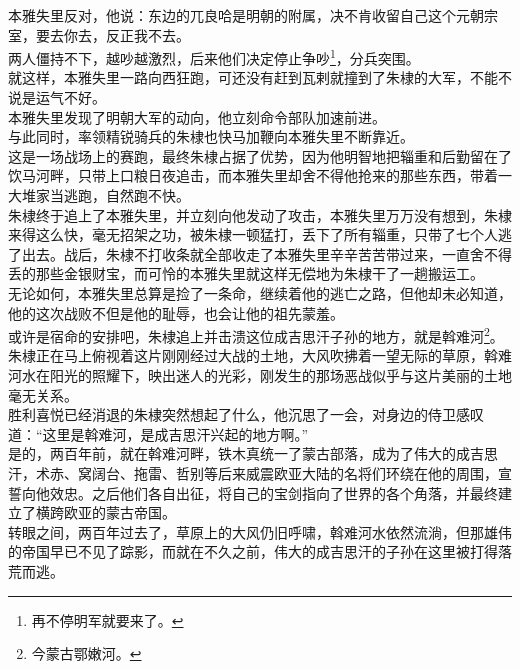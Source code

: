 \begin{multicols}{\theparacolNo}
本雅失里反对，他说：东边的兀良哈是明朝的附属，决不肯收留自己这个元朝宗室，要去你去，反正我不去。\\

两人僵持不下，越吵越激烈，后来他们决定停止争吵\footnote{再不停明军就要来了。}，分兵突围。\\

就这样，本雅失里一路向西狂跑，可还没有赶到瓦剌就撞到了朱棣的大军，不能不说是运气不好。\\

本雅失里发现了明朝大军的动向，他立刻命令部队加速前进。\\

与此同时，率领精锐骑兵的朱棣也快马加鞭向本雅失里不断靠近。\\

这是一场战场上的赛跑，最终朱棣占据了优势，因为他明智地把辎重和后勤留在了饮马河畔，只带上口粮日夜追击，而本雅失里却舍不得他抢来的那些东西，带着一大堆家当逃跑，自然跑不快。\\

朱棣终于追上了本雅失里，并立刻向他发动了攻击，本雅失里万万没有想到，朱棣来得这么快，毫无招架之功，被朱棣一顿猛打，丢下了所有辎重，只带了七个人逃了出去。战后，朱棣不打收条就全部收走了本雅失里辛辛苦苦带过来，一直舍不得丢的那些金银财宝，而可怜的本雅失里就这样无偿地为朱棣干了一趟搬运工。\\

无论如何，本雅失里总算是捡了一条命，继续着他的逃亡之路，但他却未必知道，他的这次战败不但是他的耻辱，也会让他的祖先蒙羞。\\

或许是宿命的安排吧，朱棣追上并击溃这位成吉思汗子孙的地方，就是斡难河\footnote{今蒙古鄂嫩河。}。\\

朱棣正在马上俯视着这片刚刚经过大战的土地，大风吹拂着一望无际的草原，斡难河水在阳光的照耀下，映出迷人的光彩，刚发生的那场恶战似乎与这片美丽的土地毫无关系。\\

胜利喜悦已经消退的朱棣突然想起了什么，他沉思了一会，对身边的侍卫感叹道：“这里是斡难河，是成吉思汗兴起的地方啊。”\\

是的，两百年前，就在斡难河畔，铁木真统一了蒙古部落，成为了伟大的成吉思汗，术赤、窝阔台、拖雷、哲别等后来威震欧亚大陆的名将们环绕在他的周围，宣誓向他效忠。之后他们各自出征，将自己的宝剑指向了世界的各个角落，并最终建立了横跨欧亚的蒙古帝国。\\

转眼之间，两百年过去了，草原上的大风仍旧呼啸，斡难河水依然流淌，但那雄伟的帝国早已不见了踪影，而就在不久之前，伟大的成吉思汗的子孙在这里被打得落荒而逃。\\


\end{multicols}
